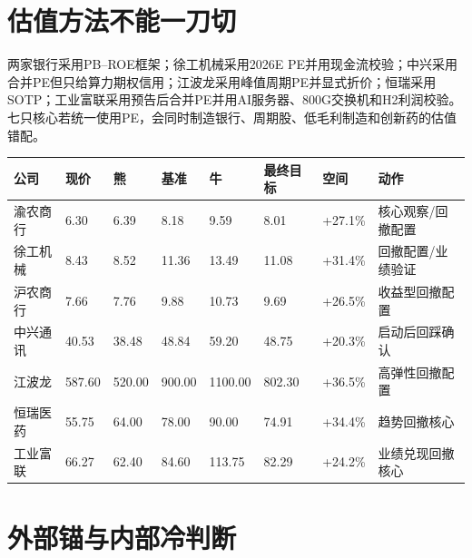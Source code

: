 \section{估值方法不能一刀切}

两家银行采用PB--ROE框架；徐工机械采用2026E PE并用现金流校验；中兴采用合并PE但只给算力期权信用；江波龙采用峰值周期PE并显式折价；恒瑞采用SOTP；工业富联采用预告后合并PE并用AI服务器、800G交换机和H2利润校验。七只核心若统一使用PE，会同时制造银行、周期股、低毛利制造和创新药的估值错配。

\begin{exhibitbox}
\begin{tabularx}{\textwidth}{L{2.0cm}R{1.35cm}R{1.35cm}R{1.35cm}R{1.45cm}R{1.45cm}R{1.45cm}X}
\toprule
\textbf{公司} & \textbf{现价} & \textbf{熊} & \textbf{基准} & \textbf{牛} & \textbf{最终目标} & \textbf{空间} & \textbf{动作} \\
\midrule
渝农商行 & 6.30 & 6.39 & 8.18 & 9.59 & 8.01 & +27.1\% & 核心观察/回撤配置 \\
徐工机械 & 8.43 & 8.52 & 11.36 & 13.49 & 11.08 & +31.4\% & 回撤配置/业绩验证 \\
沪农商行 & 7.66 & 7.76 & 9.88 & 10.73 & 9.69 & +26.5\% & 收益型回撤配置 \\
中兴通讯 & 40.53 & 38.48 & 48.84 & 59.20 & 48.75 & +20.3\% & 启动后回踩确认 \\
江波龙 & 587.60 & 520.00 & 900.00 & 1100.00 & 802.30 & +36.5\% & 高弹性回撤配置 \\
恒瑞医药 & 55.75 & 64.00 & 78.00 & 90.00 & 74.91 & +34.4\% & 趋势回撤核心 \\
工业富联 & 66.27 & 62.40 & 84.60 & 113.75 & 82.29 & +24.2\% & 业绩兑现回撤核心 \\
\bottomrule
\end{tabularx}
\end{exhibitbox}

\section{外部锚与内部冷判断}

